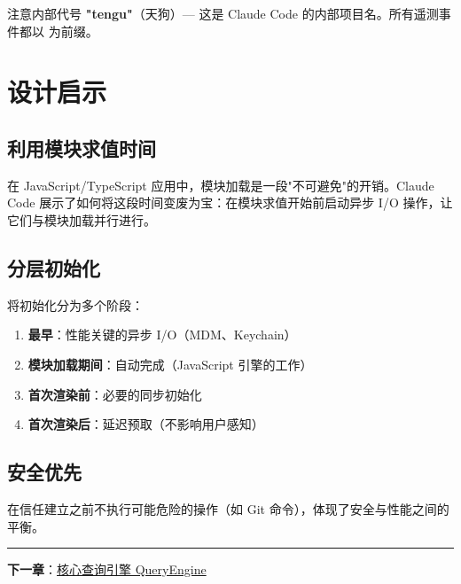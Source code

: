 注意内部代号 \textbf{"tengu"}（天狗）— 这是 Claude Code 的内部项目名。所有遥测事件都以  为前缀。

\section{设计启示}

\subsection{利用模块求值时间}

在 JavaScript/TypeScript 应用中，模块加载是一段"不可避免"的开销。Claude Code 展示了如何将这段时间变废为宝：在模块求值开始前启动异步 I/O 操作，让它们与模块加载并行进行。

\subsection{分层初始化}

将初始化分为多个阶段：
\begin{enumerate}[nosep]
  \item \textbf{最早}：性能关键的异步 I/O（MDM、Keychain）
  \item \textbf{模块加载期间}：自动完成（JavaScript 引擎的工作）
  \item \textbf{首次渲染前}：必要的同步初始化
  \item \textbf{首次渲染后}：延迟预取（不影响用户感知）
\end{enumerate}

\subsection{安全优先}

在信任建立之前不执行可能危险的操作（如 Git 命令），体现了安全与性能之间的平衡。

\bigskip\noindent\rule{\textwidth}{0.4pt}\bigskip

\textbf{下一章}：\href{./chapter-04-query-engine.md}{核心查询引擎 QueryEngine}
